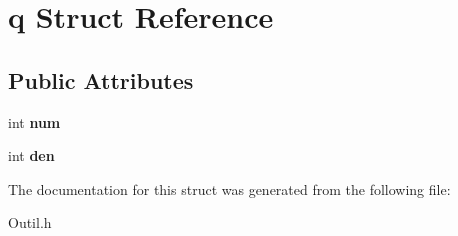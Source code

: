 \hypertarget{structq}{}\section{q Struct Reference}
\label{structq}
\subsection*{Public Attributes}
\begin{DoxyCompactItemize}
\item 
int {\bfseries num}\hypertarget{structq_ad831a2a767774a3ff554aeb2651c79a2}{}\label{structq_ad831a2a767774a3ff554aeb2651c79a2}

\item 
int {\bfseries den}\hypertarget{structq_a1ffe0f05184e54ab3f901a78cf32d09f}{}\label{structq_a1ffe0f05184e54ab3f901a78cf32d09f}

\end{DoxyCompactItemize}


The documentation for this struct was generated from the following file\+:\begin{DoxyCompactItemize}
\item 
Outil.\+h\end{DoxyCompactItemize}
